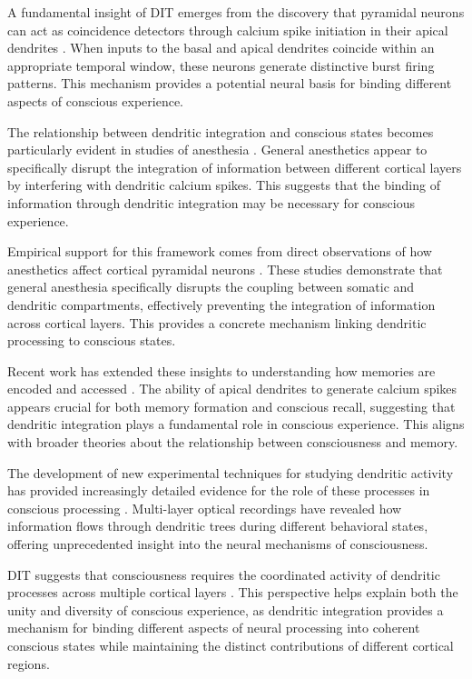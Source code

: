 \begin{refsection}
A fundamental insight of DIT emerges from the discovery that pyramidal neurons can act as coincidence detectors through calcium spike initiation in their apical dendrites \cite{Larkum2013}. When inputs to the basal and apical dendrites coincide within an appropriate temporal window, these neurons generate distinctive burst firing patterns. This mechanism provides a potential neural basis for binding different aspects of conscious experience.

The relationship between dendritic integration and conscious states becomes particularly evident in studies of anesthesia \cite{Phillips2018}. General anesthetics appear to specifically disrupt the integration of information between different cortical layers by interfering with dendritic calcium spikes. This suggests that the binding of information through dendritic integration may be necessary for conscious experience.

Empirical support for this framework comes from direct observations of how anesthetics affect cortical pyramidal neurons \cite{Suzuki2020}. These studies demonstrate that general anesthesia specifically disrupts the coupling between somatic and dendritic compartments, effectively preventing the integration of information across cortical layers. This provides a concrete mechanism linking dendritic processing to conscious states.

Recent work has extended these insights to understanding how memories are encoded and accessed \cite{Shin2021}. The ability of apical dendrites to generate calcium spikes appears crucial for both memory formation and conscious recall, suggesting that dendritic integration plays a fundamental role in conscious experience. This aligns with broader theories about the relationship between consciousness and memory.

The development of new experimental techniques for studying dendritic activity has provided increasingly detailed evidence for the role of these processes in conscious processing \cite{Suzuki2021}. Multi-layer optical recordings have revealed how information flows through dendritic trees during different behavioral states, offering unprecedented insight into the neural mechanisms of consciousness.

DIT suggests that consciousness requires the coordinated activity of dendritic processes across multiple cortical layers \cite{Aru2019}. This perspective helps explain both the unity and diversity of conscious experience, as dendritic integration provides a mechanism for binding different aspects of neural processing into coherent conscious states while maintaining the distinct contributions of different cortical regions.


\end{refsection}
